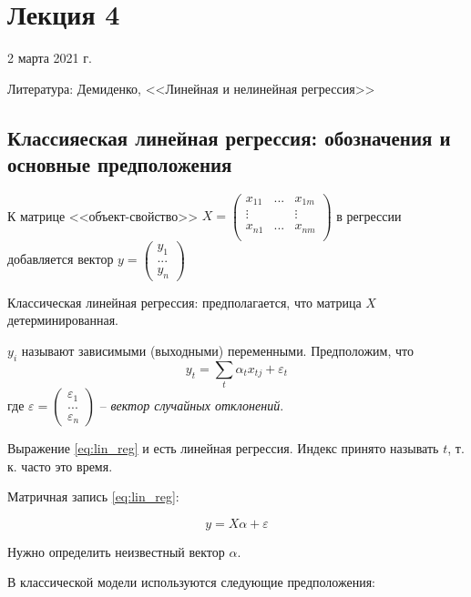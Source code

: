 \documentclass[main.tex]{subfiles}
\begin{document}
\section{Лекция 4}
2 марта 2021 г.

Литература: Демиденко, <<Линейная и нелинейная регрессия>>

\subsection{Классияеская линейная регрессия: обозначения и основные предположения}

К матрице <<объект-свойство>> $ X = \begin{pmatrix}
    x_{11}&  ... & x_{1m} \\
    \vdots & & \vdots \\
    x_{n1}&  ... & x_{nm} \\
\end{pmatrix} $ в регрессии добавляется вектор $ y = \begin{pmatrix}
y_1 \\ ... \\ y_n
\end{pmatrix} $

Классическая линейная регрессия: предполагается, что матрица $ X $ детерминированная.

$y_i$ называют зависимыми (выходными) переменными.
Предположим, что
\begin{equation} \label{eq:lin_reg}
    y_t = \sum_t \alpha_t x_{tj} + \varepsilon_t
\end{equation}
 где $\varepsilon = \begin{pmatrix}
    \varepsilon_1 \\ ... \\ \varepsilon_n
\end{pmatrix}$ -- \emph{вектор случайных отклонений}.

Выражение \eqref{eq:lin_reg} и есть линейная регрессия.
Индекс принято называть $t$, т. к. часто это время.

Матричная запись \eqref{eq:lin_reg}:

\begin{equation} \label{eq:lin_reg_mtx}
    y = X \alpha + \varepsilon
\end{equation}

Нужно определить неизвестный вектор $ \alpha $.

В классической модели используются следующие предположения:
\end{document}
